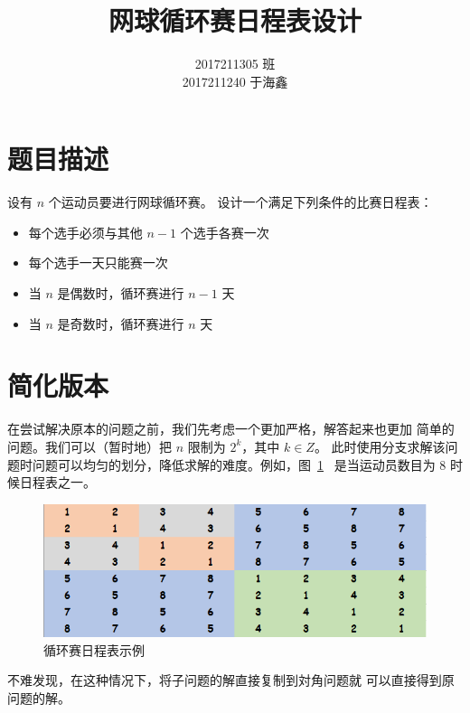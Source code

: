 \documentclass[ichigo,normal,cn]{elegantnote_mod}
\title{网球循环赛日程表设计}
\author{2017211305 班 \\ 2017211240 于海鑫}
\begin{document}
\maketitle

\section{题目描述}

设有 $n$ 个运动员要进行网球循环赛。
设计一个满足下列条件的比赛日程表：
\begin{itemize}
    \item 每个选手必须与其他 $n-1$ 个选手各赛一次
    \item 每个选手一天只能赛一次
    \item 当 $n$ 是偶数时，循环赛进行 $n-1$ 天
    \item 当 $n$ 是奇数时，循环赛进行 $n$ 天
\end{itemize}

\section{简化版本}

在尝试解决原本的问题之前，我们先考虑一个更加严格，解答起来也更加
简单的问题。我们可以（暂时地）把 $n$ 限制为 $2^k$，其中 $k \in Z$。
此时使用分支求解该问题时问题可以均匀的划分，降低求解的难度。例如，图~\ref{fig:Tour}~
是当运动员数目为 8 时候日程表之一。

\begin{figure}[!htbp]
    \centering
    \includegraphics[width=.8\textwidth]{fig-1}
    \caption{循环赛日程表示例}
    \label{fig:Tour}
\end{figure}

不难发现，在这种情况下，将子问题的解直接复制到対角问题就
可以直接得到原问题的解。
\end{document}
